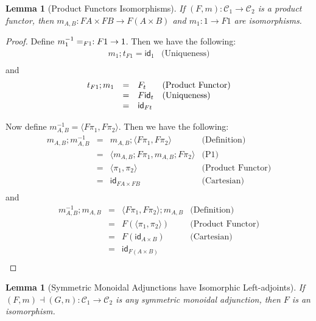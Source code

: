 \documentclass{article}
\let\mto\to
\let\to\relax
\newcommand{\to}{\rightarrow}
\let\t\relax
\newcommand{\cat}[1]{\mathcal{#1}}
\newcommand{\id}[0]{\mathsf{id}}
\newcommand{\t}[0]{\mathsf{t}}
\newtheorem{lemma}[theorem]{Lemma}
\begin{document}
\begin{lemma}[Product Functors Isomorphisms]
  \label{lemma:product_functors_iso}
  If $(F,m) : \cat{C}_1 \mto \cat{C}_2$ is a product functor, then
  $m_{A,B} : FA \times FB \mto F(A \times B)$ and $m_1 : 1 \mto F1$ are
  isomorphisms.
\end{lemma}
\begin{proof}
  Define $m^{-1}_1 = \t_{F 1} : F1 \mto 1$.  Then we have the following:
  \[
  \begin{array}{lll}
    m_1;t_{F1} = \id_{1} & \text{(Uniqueness)}\\    
  \end{array}
  \]
  and
  \[
  \begin{array}{llll}
    t_{F1};m_1
    & = & F\t_t & \text{(Product Functor)}\\
    & = & F\id_t & \text{(Uniqueness)}\\
    & = & \id_{Ft}     
  \end{array}
  \]

  Now define $m^{-1}_{A,B} = \langle F\pi_1, F\pi_2 \rangle$.  Then we have the following:
  \[
  \begin{array}{llll}
    m_{A,B};m^{-1}_{A,B}
    & = & m_{A,B};\langle F\pi_1, F\pi_2 \rangle & \text{(Definition)}\\
    & = & \langle m_{A,B};F\pi_1, m_{A,B};F\pi_2 \rangle & \text{(P1)}\\
    & = & \langle \pi_1, \pi_2 \rangle & \text{(Product Functor)}\\
    & = & \id_{FA \times FB} & \text{(Cartesian)}\\
  \end{array}
  \]
  and
  \[
  \begin{array}{llll}
    m^{-1}_{A,B};m_{A,B}
    & = & \langle F\pi_1, F\pi_2 \rangle;m_{A,B} & \text{(Definition)}\\
    & = & F(\langle \pi_1, \pi_2 \rangle) & \text{(Product Functor)}\\
    & = & F(\id_{A \times B}) & \text{(Cartesian)}\\
    & = & \id_{F(A \times B)}\\    
  \end{array}
  \]
\end{proof}

\begin{lemma}[Symmetric Monoidal Adjunctions have Isomorphic Left-adjoints]
  \label{lemma:product_functors_iso}
  If $(F,m)\dashv (G,n) : \cat{C}_1 \mto \cat{C}_2$ is any symmetric monoidal adjunction, then
  $F$  is an 
  isomorphism. 
\end{lemma}
\end{document}
